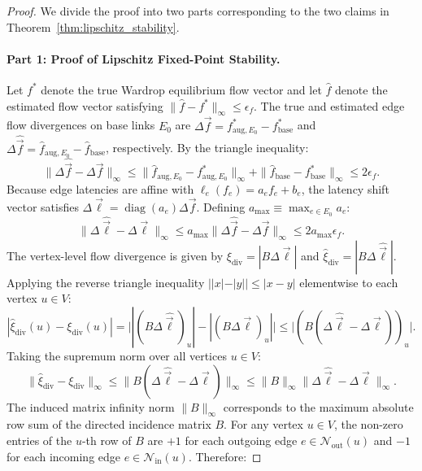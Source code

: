 \documentclass[11pt,a4paper]{article}
\begin{document}
\begin{proof}
We divide the proof into two parts corresponding to the two claims in Theorem~\ref{thm:lipschitz_stability}.

\paragraph{Part 1: Proof of Lipschitz Fixed-Point Stability.}
Let $f^*$ denote the true Wardrop equilibrium flow vector and let $\hat{f}$ denote the estimated flow vector satisfying $\|\hat{f} - f^*\|_\infty \le \epsilon_f$. 
The true and estimated edge flow divergences on base links $E_0$ are $\Delta \vec{f} = f_{\text{aug}, E_0}^* - f_{\text{base}}^*$ and $\Delta \hat{\vec{f}} = \hat{f}_{\text{aug}, E_0} - \hat{f}_{\text{base}}$, respectively. By the triangle inequality:
\begin{equation}
\|\Delta \hat{\vec{f}} - \Delta \vec{f}\|_\infty \le \|\hat{f}_{\text{aug}, E_0} - f_{\text{aug}, E_0}^*\|_\infty + \|\hat{f}_{\text{base}} - f_{\text{base}}^*\|_\infty \le 2\epsilon_f.
\end{equation}
Because edge latencies are affine with $\ell_e(f_e) = a_e f_e + b_e$, the latency shift vector satisfies $\Delta \vec{\ell} = \operatorname{diag}(a_e) \Delta \vec{f}$. Defining $a_{\max} \equiv \max_{e \in E_0} a_e$:
\begin{equation}
\|\Delta \hat{\vec{\ell}} - \Delta \vec{\ell}\|_\infty \le a_{\max} \|\Delta \hat{\vec{f}} - \Delta \vec{f}\|_\infty \le 2 a_{\max} \epsilon_f.
\end{equation}
The vertex-level flow divergence is given by $\xi_{\text{div}} = |B \Delta \vec{\ell}|$ and $\hat{\xi}_{\text{div}} = |B \Delta \hat{\vec{\ell}}|$. Applying the reverse triangle inequality $||x| - |y|| \le |x - y|$ elementwise to each vertex $u \in V$:
\begin{equation}
|\hat{\xi}_{\text{div}}(u) - \xi_{\text{div}}(u)| = \big| |(B \Delta \hat{\vec{\ell}})_u| - |(B \Delta \vec{\ell})_u| \big| \le \big| (B (\Delta \hat{\vec{\ell}} - \Delta \vec{\ell}))_u \big|.
\end{equation}
Taking the supremum norm over all vertices $u \in V$:
\begin{equation}
\|\hat{\xi}_{\text{div}} - \xi_{\text{div}}\|_\infty \le \|B (\Delta \hat{\vec{\ell}} - \Delta \vec{\ell})\|_\infty \le \|B\|_\infty \|\Delta \hat{\vec{\ell}} - \Delta \vec{\ell}\|_\infty.
\end{equation}
The induced matrix infinity norm $\|B\|_\infty$ corresponds to the maximum absolute row sum of the directed incidence matrix $B$. For any vertex $u \in V$, the non-zero entries of the $u$-th row of $B$ are $+1$ for each outgoing edge $e \in \mathcal{N}_{\text{out}}(u)$ and $-1$ for each incoming edge $e \in \mathcal{N}_{\text{in}}(u)$. Therefore:

\end{proof}
\end{document}
